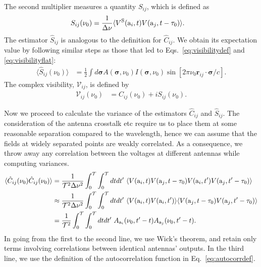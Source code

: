 \documentclass[11pt]{article}
\numberwithin{equation}{section}
\newcommand{\bt}[1]{\mathbf{#1}}
\begin{document}
The second multiplier measures a quantity $S_{ij}$, which is defined as
\begin{align}
  S_{ij}(\nu_0) & = \frac{1}{\Delta \nu} \langle V^{\rm S}({\rm a}_i, t) V({\rm a}_j, t - \tau_0) \rangle \mbox{.}
\end{align}
The estimator $\hat{S}_{ij}$ is analogous to the definition for $\hat{C}_{ij}$. We obtain its expectation value by following similar steps as those that led to Eqs.~\eqref{eq:visibilitydef} and \eqref{eq:visibilityflat}:
\begin{align}
  \langle \hat{S}_{ij}(\nu_0) \rangle & = \frac12 \int d \bm{\sigma} A(\bm \sigma, \nu_0) I(\bm \sigma, \nu_0)  \sin{\left[ 2\pi \nu_{0} \bt r_{ij} \cdot \bm \sigma/c \right]} \mbox{.} \label{eq:visibilitysineflat}
\end{align}
The complex visibility, $\mathcal{V}_{ij}$, is defined by
\begin{align}
  \mathcal{V}_{ij}(\nu_0) & = C_{ij}(\nu_0) + i S_{ij}(\nu_0) \mbox{.}
\end{align}

Now we proceed to calculate the variance of the estimators $\hat{C}_{ij}$ and $\hat{S}_{ij}$. The consideration of the antenna crosstalk etc require us to place them at some reasonable separation compared to the wavelength, hence we can assume that the fields at widely separated points are weakly correlated. As a consequence, we throw away any correlation between the voltages at different antennas while computing variances.
\begin{align}
  \langle \hat{C}_{ij}(\nu_0) \hat{C}_{ij}(\nu_0) \rangle & = \frac{1}{{\cal T}^2 \Delta \nu^2} \int_0^{\cal T} \int_0^{\cal T} dt dt^\prime \ \langle V({\rm a}_i, t) V({\rm a}_j, t - \tau_0) V({\rm a}_i, t^\prime) V({\rm a}_j, t^\prime - \tau_0) \rangle \notag \\
  & \approx \frac{1}{{\cal T}^2 \Delta \nu^2} \int_0^{\cal T} \int_0^{\cal T} dt dt^\prime \ \langle V({\rm a}_i, t) V({\rm a}_i, t^\prime) \rangle \langle V({\rm a}_j, t - \tau_0)  V({\rm a}_j, t^\prime - \tau_0) \rangle \notag \\
  & = \frac{1}{{\cal T}^2} \int_0^{\cal T} \int_0^{\cal T} dt dt^\prime \ A_{{\rm a}_i}(\nu_0, t^\prime - t) A_{{\rm a}_j}(\nu_0, t^\prime - t) \mbox{.}
\end{align}
In going from the first to the second line, we use Wick's theorem, and retain only terms involving correlations between identical antennas' outputs. In the third line, we use the definition of the autocorrelation function in Eq.~\eqref{eq:autocorrdef}. 
\end{document}
